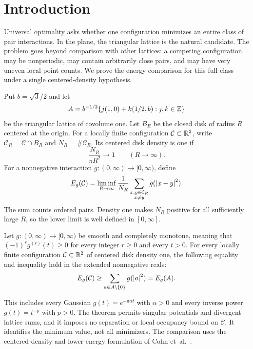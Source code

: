 \section{Introduction}\label{sec:introduction}

Universal optimality asks whether one configuration minimizes an entire
class of pair interactions.  In the plane, the triangular lattice is the
natural candidate.  The problem goes beyond comparison with other lattices:
a competing configuration may be nonperiodic, may contain arbitrarily close
pairs, and may have very uneven local point counts.  We prove the energy
comparison for this full class under a single centered-density hypothesis.

Put $b=\sqrt3/2$ and let
\[
 A=b^{-1/2}\{j(1,0)+k(1/2,b):j,k\in\mathbb Z\}
\]
be the triangular lattice of covolume one.  Let $B_R$ be the closed disk of
radius $R$ centered at the origin.  For a locally finite configuration
$\mathcal C\subset\mathbb R^2$, write
$\mathcal C_R=\mathcal C\cap B_R$ and $N_R=\#\mathcal C_R$.  Its centered
disk density is one if
\[
 \frac{N_R}{\pi R^2}\longrightarrow1\qquad(R\to\infty).
\]
For a nonnegative interaction $g:(0,\infty)\to[0,\infty)$, define
\begin{equation}\label{eq:energy-definition}
 E_g(\mathcal C)=\liminf_{R\to\infty}\frac1{N_R}
 \sum_{\substack{x,y\in\mathcal C_R\\x\ne y}}g(\left\lvert x-y\right\rvert^2).
\end{equation}
The sum counts ordered pairs.  Density one makes $N_R$ positive for all
sufficiently large $R$, so the lower limit is well defined in $[0,\infty]$.

\begin{theorem}\label{thm:universal}
Let $g:(0,\infty)\to[0,\infty)$ be smooth and completely monotone, meaning
that $(-1)^r g^{(r)}(t)\ge0$ for every integer $r\ge0$ and every $t>0$.
For every locally finite configuration $\mathcal C\subset\mathbb R^2$ of centered
disk density one, the following equality and inequality hold in the extended
nonnegative reals:
\begin{equation}\label{eq:main-inequality}
 E_g(\mathcal C)\ge
 \sum_{a\in A\setminus\{0\}}g(\left\lvert a\right\rvert^2)=E_g(A).
\end{equation}
\end{theorem}

This includes every Gaussian $g(t)=e^{-\pi\alpha t}$ with $\alpha>0$ and
every inverse power $g(t)=t^{-p}$ with $p>0$.  The theorem permits singular
potentials and divergent lattice sums, and it imposes no separation or local
occupancy bound on $\mathcal C$.  It identifies the minimum value, not all
minimizers.  The comparison uses the centered-density and lower-energy
formulation of Cohn et~al.~\citep[Definitions~1.1--1.3]{CKMRV2022}.

